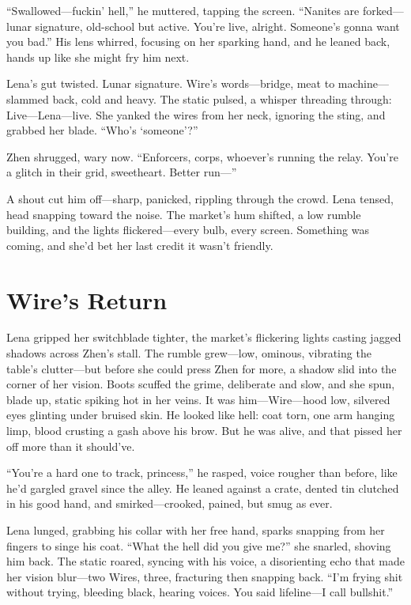 \documentclass[12pt]{book}
\begin{document}
``Swallowed---fuckin’ hell,'' he muttered, tapping the screen. ``Nanites are forked---lunar signature, old-school but active. You’re live, alright. Someone’s gonna want you bad.'' His lens whirred, focusing on her sparking hand, and he leaned back, hands up like she might fry him next.

Lena’s gut twisted. Lunar signature. Wire’s words---bridge, meat to machine---slammed back, cold and heavy. The static pulsed, a whisper threading through: Live---Lena---live. She yanked the wires from her neck, ignoring the sting, and grabbed her blade. ``Who’s ‘someone’?''

Zhen shrugged, wary now. ``Enforcers, corps, whoever’s running the relay. You’re a glitch in their grid, sweetheart. Better run---''

A shout cut him off---sharp, panicked, rippling through the crowd. Lena tensed, head snapping toward the noise. The market’s hum shifted, a low rumble building, and the lights flickered---every bulb, every screen. Something was coming, and she’d bet her last credit it wasn’t friendly.

\section{Wire's Return}

Lena gripped her switchblade tighter, the market’s flickering lights casting jagged shadows across Zhen’s stall. The rumble grew---low, ominous, vibrating the table’s clutter---but before she could press Zhen for more, a shadow slid into the corner of her vision. Boots scuffed the grime, deliberate and slow, and she spun, blade up, static spiking hot in her veins. It was him---Wire---hood low, silvered eyes glinting under bruised skin. He looked like hell: coat torn, one arm hanging limp, blood crusting a gash above his brow. But he was alive, and that pissed her off more than it should’ve.

``You're a hard one to track, princess,'' he rasped, voice rougher than before, like he'd gargled gravel since the alley. He leaned against a crate, dented tin clutched in his good hand, and smirked---crooked, pained, but smug as ever.

Lena lunged, grabbing his collar with her free hand, sparks snapping from her fingers to singe his coat. ``What the hell did you give me?'' she snarled, shoving him back. The static roared, syncing with his voice, a disorienting echo that made her vision blur---two Wires, three, fracturing then snapping back. ``I'm frying shit without trying, bleeding black, hearing voices. You said lifeline---I call bullshit.''
\end{document}
